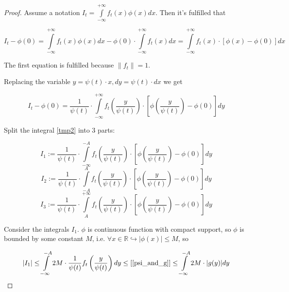 \documentclass{article}
\begin{document}
    \begin{proof}
        Assume a notation $I_t = \int\limits_{-\infty}^{+\infty} f_t(x) \phi(x) dx$. Then it's fulfilled that

        \begin{equation*}
            I_t - \phi(0) = \int\limits_{-\infty}^{+\infty} f_t(x) \phi(x) dx - \phi(0) \cdot \int\limits_{-\infty}^{+\infty} f_t(x) dx = \int\limits_{-\infty}^{+\infty} f_t(x) \cdot [\phi(x) - \phi(0)] dx
        \end{equation*}

        The first equation is fulfilled because $\|f_t\| = 1$.
        
        Replacing the variable $y = \psi(t) \cdot x, dy = \psi(t) \cdot dx$ we get

        \begin{equation} \label{tmp2}
            I_t - \phi(0) = \dfrac{1}{\psi(t)} \cdot \int\limits_{-\infty}^{+\infty} f_t\left(\frac{y}{\psi(t)}\right) \cdot \left[\phi\left(\frac{y}{\psi(t)}\right) - \phi(0)\right] dy
        \end{equation}

        Split the integral \eqref{tmp2} into 3 parts:
        
        \begin{equation*}
            I_1 := \dfrac{1}{\psi(t)} \cdot \int\limits_{-\infty}^{-A} f_t\left(\frac{y}{\psi(t)}\right) \cdot \left[\phi\left(\frac{y}{\psi(t)}\right) - \phi(0)\right] dy
        \end{equation*}
        \begin{equation*}
            I_2 := \dfrac{1}{\psi(t)} \cdot \int\limits_{-A}^{A} f_t\left(\frac{y}{\psi(t)}\right) \cdot \left[\phi\left(\frac{y}{\psi(t)}\right) - \phi(0)\right] dy
        \end{equation*}
        \begin{equation*}
            I_3 := \dfrac{1}{\psi(t)} \cdot \int\limits_{A}^{+\infty} f_t\left(\frac{y}{\psi(t)}\right) \cdot \left[\phi\left(\frac{y}{\psi(t)}\right) - \phi(0)\right] dy
        \end{equation*}

        Consider the integrals $I_1$. $\phi$ is continuous function with compact support, so $\phi$ is bounded by some constant $M$, i.e. $\forall x \in \mathbb{R} \hookrightarrow |\phi(x)| \leq M$, so 

        \begin{equation*}
            \left|I_1\right| \leq \int\limits_{-\infty}^{-A} 2 M \cdot \dfrac{1}{\psi(t)} f_t\left(\frac{y}{\psi(t)}\right) dy \leq \left[\eqref{psi_and_g}\right]
            \leq \int\limits_{-\infty}^{-A} 2 M \cdot |g(y)| dy 
        \end{equation*}


\end{proof}
\end{document}
